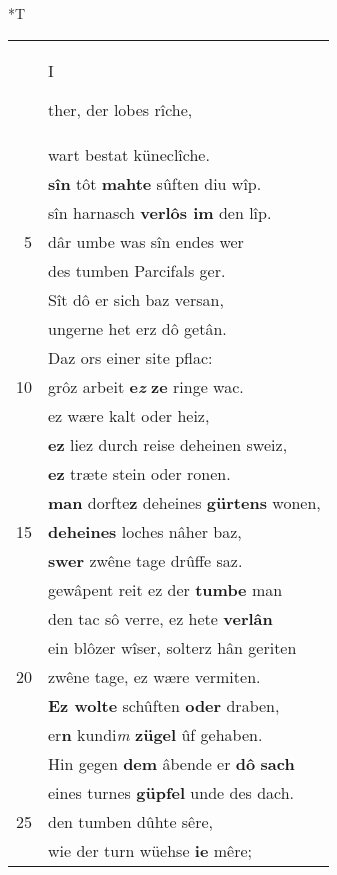 \documentclass[8pt,a4paper,notitlepage]{article}
\begin{document}
\begin{table}[ht]
\begin{minipage}[t]{0.5\linewidth}
\end{minipage}
\hspace{0.5cm}
\begin{minipage}[t]{0.5\linewidth}
\small
\begin{center}*T
\end{center}
\begin{tabular}{rl}
 & \begin{Large}I\end{Large}ther, der lobes rîche,\\ 
 & wart bestat küneclîche.\\ 
 & \textbf{sîn} tôt \textbf{mahte} sûften diu wîp.\\ 
 & sîn harnasch \textbf{verlôs im} den lîp.\\ 
5 & dâr umbe was sîn endes wer\\ 
 & des tumben Parcifals ger.\\ 
 & Sît dô er sich baz versan,\\ 
 & ungerne het erz dô getân.\\ 
 & Daz ors einer site pflac:\\ 
10 & grôz arbeit \textbf{e\textit{z}} \textbf{ze} ringe wac.\\ 
 & ez wære kalt oder heiz,\\ 
 & \textbf{ez} liez durch reise deheinen sweiz,\\ 
 & \textbf{ez} træte stein oder ronen.\\ 
 & \textbf{man} dorfte\textbf{z} deheines \textbf{gürtens} wonen,\\ 
15 & \textbf{deheines} loches nâher baz,\\ 
 & \textbf{swer} zwêne tage drûffe saz.\\ 
 & gewâpent reit ez der \textbf{tumbe} man\\ 
 & den tac sô verre, ez hete \textbf{verlân}\\ 
 & ein blôzer wîser, solterz hân geriten\\ 
20 & zwêne tage, ez wære vermiten.\\ 
 & \textbf{Ez wolte} schûften \textbf{oder} draben,\\ 
 & er\textbf{n} kundi\textit{m} \textbf{zügel} ûf gehaben.\\ 
 & Hin gegen \textbf{dem} âbende er \textbf{dô} \textbf{sach}\\ 
 & eines turnes \textbf{güpfel} unde des dach.\\ 
25 & den tumben dûhte sêre,\\ 
 & wie der turn wüehse \textbf{ie} mêre;\\ 

\end{tabular}
\end{minipage}
\end{table}
\end{document}
